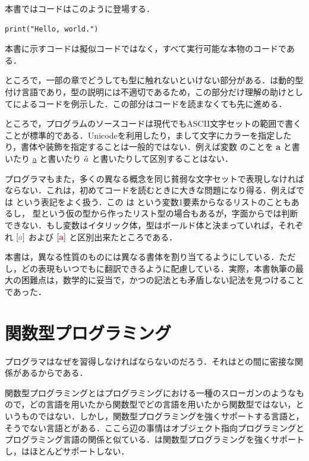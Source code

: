\documentclass[a5paper,twoside,fleqn,draft]{jsbook}
\begin{document}
本書では\python コードはこのように登場する．
\begin{pythoncode}
\begin{verbatim}
print("Hello, world.")
\end{verbatim}
\end{pythoncode}
本書に示すコードは擬似コードではなく，すべて実行可能な本物のコードである．

ところで，一部の章でどうしても型に触れないといけない部分がある．\python は動的型付け言語であり，型の説明には不適切であるため，この部分だけ理解の助けとして\cxxseventeen によるコードを例示した．この部分はコードを読まなくても先に進める．

\separator

ところで，プログラムのソースコードは現代でもASCII文字セットの範囲で書くことが標準的である．Unicodeを利用したり，まして文字にカラーを指定したり，書体や装飾を指定することは一般的ではない．例えば変数  のことを \textbf{a} と書いたり \underline{a} と書いたり $\Hat a$ と書いたりして区別することはない．

\haskell プログラマもまた，多くの異なる概念を同じ貧弱な文字セットで表現しなければならない．これは，初めて\haskell コードを読むときに大きな問題になり得る．例えば\haskell では \code{[a]} という表記をよく扱う．この \code{[a]} は  という変数1要素からなるリストのこともあるし，  型という仮の型から作ったリスト型の場合もあるが，字面からでは判断できない．もし変数はイタリック体，型はボールド体と決まっていれば，それぞれ $\hListWith{\hVar{a}}$ および $\hListConstruct{\hTypeName{a}}$ と区別出来たところである．

本書は，異なる性質のものには異なる書体を割り当てるようにしている．ただし，どの表現もいつでも\haskell に翻訳できるように配慮している．実際，本書執筆の最大の困難点は，数学的に妥当で，かつ\haskell の記法とも矛盾しない記法を見つけることであった．

\section{関数型プログラミング}

プログラマはなぜ\haskell を習得しなければならないのだろう．それは\haskell との間に密接な関係があるからである．

関数型プログラミングとはプログラミングにおける一種のスローガンのようなもので，どの言語を用いたから関数型でどの言語を用いたから関数型ではない，というものではない．しかし，関数型プログラミングを強くサポートする言語と，そうでない言語とがある．ここら辺の事情はオブジェクト指向プログラミングとプログラミング言語の関係と似ている．\haskell は関数型プログラミングを強くサポートし，\python はほとんどサポートしない．
\end{document}
